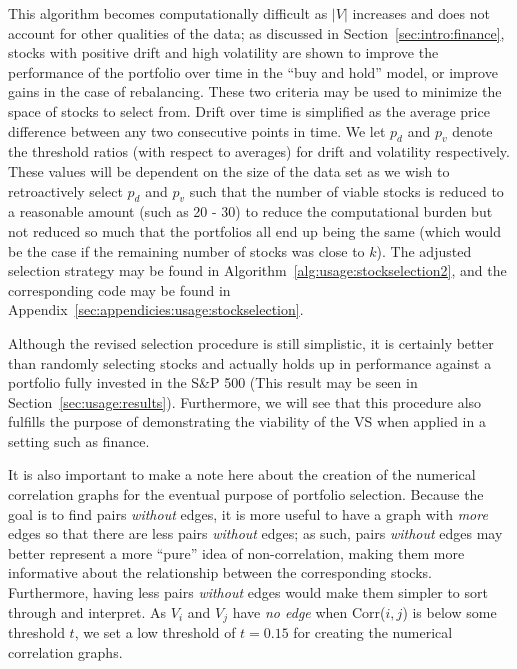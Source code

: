 This algorithm becomes computationally difficult as $|V|$ increases and does 
not account for other qualities of the data; as discussed in 
Section~\ref{sec:intro:finance}, stocks with positive drift and high volatility 
are shown to improve the performance of the portfolio over time in the ``buy 
and hold'' model, or improve gains in the case of rebalancing. These two 
criteria may be used to minimize the space of stocks to select from. Drift over 
time is simplified as the average price difference between any two consecutive 
points in time. We let $p_d$ and $p_v$ denote the threshold ratios
(with respect to averages) for drift and volatility respectively. These 
values will be dependent on the size of the data set as we wish to 
retroactively select $p_d$ and $p_v$ such that the number of viable stocks is 
reduced to a reasonable amount (such as 20 - 30) to reduce the computational 
burden but not reduced so much that the portfolios all end up being the same 
(which would be the case if the 
remaining number of stocks was close to $k$). The adjusted selection strategy 
may be found in Algorithm~\ref{alg:usage:stockselection2}, and the 
corresponding code may be found in 
Appendix~\ref{sec:appendicies:usage:stockselection}.

Although the revised selection procedure is still simplistic, it is certainly 
better than randomly selecting stocks and actually holds up in performance 
against a portfolio fully invested in the S\&P 500 (This result may be seen in 
Section~\ref{sec:usage:results}). Furthermore, we will see that this procedure 
also fulfills the purpose of demonstrating the viability of the VS when applied 
in a setting such as finance.

It is also important to make a note here about the creation of the numerical
correlation graphs for the eventual purpose of portfolio selection.
Because the goal is to find pairs \textit{without} edges, it is more useful to 
have a graph with \textit{more} edges so that there are less 
pairs \textit{without} edges; as such, pairs \textit{without} edges may better 
represent a more ``pure'' idea of non-correlation, making them more informative 
about the relationship between the corresponding stocks. Furthermore, having 
less pairs \textit{without} edges would make them simpler to sort through and 
interpret.
As $V_i$ and $V_j$ have \textit{no edge} when Corr($i,j$) is below some 
threshold $t$, we set a low threshold of $t = 0.15$ 
for creating the numerical correlation graphs.

